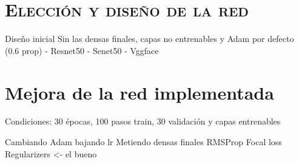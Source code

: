 \documentclass[11pt,a4paper]{article}
\begin{document}
\section{\textsc{Elección y diseño de la red}}
Diseño inicial
Sin las densas finales, capas no entrenables y Adam por defecto (0.6 prop)
    - Resnet50
    - Senet50
    - Vggface

\section{Mejora de la red implementada}

Condiciones: 30 épocas, 100 pasos train, 30 validación y capas entrenables

Cambiando Adam bajando lr
Metiendo densas finales
RMSProp
Focal loss
Regularizers <- el bueno
\end{document}
